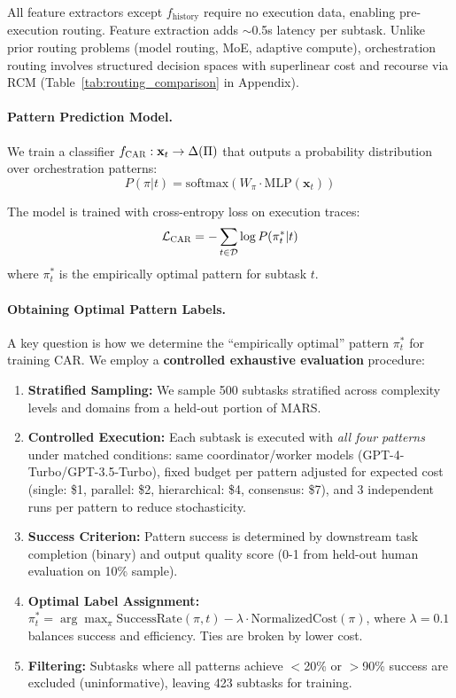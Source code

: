 \documentclass{article}
\theoremstyle{plain}
\theoremstyle{definition}
\theoremstyle{remark}
\begin{document}
All feature extractors except $f_{\text{history}}$ require no execution data, enabling pre-execution routing. Feature extraction adds $\sim$0.5s latency per subtask. Unlike prior routing problems (model routing, MoE, adaptive compute), orchestration routing involves structured decision spaces with superlinear cost and recourse via RCM (Table~\ref{tab:routing_comparison} in Appendix).

\paragraph{Pattern Prediction Model.}

We train a classifier $f_{\textsc{CAR}{}}: \mathbf{x}_t \rightarrow \Delta(\Pi)$ that outputs a probability distribution over orchestration patterns:
\begin{equation}
	P(\pi | t) = \text{softmax}(W_\pi \cdot \text{MLP}(\mathbf{x}_t))
\end{equation}

The model is trained with cross-entropy loss on execution traces:
\begin{equation}
	\mathcal{L}_{\textsc{CAR}{}} = -\sum_{t \in \mathcal{D}} \log P(\pi^*_t | t)
\end{equation}
where $\pi^*_t$ is the empirically optimal pattern for subtask $t$.

\paragraph{Obtaining Optimal Pattern Labels.}
A key question is how we determine the ``empirically optimal'' pattern $\pi^*_t$ for training CAR. We employ a \textbf{controlled exhaustive evaluation} procedure:

\begin{enumerate}[nosep,leftmargin=*]
	\item \textbf{Stratified Sampling:} We sample 500 subtasks stratified across complexity levels and domains from a held-out portion of MARS.
	\item \textbf{Controlled Execution:} Each subtask is executed with \emph{all four patterns} under matched conditions: same coordinator/worker models (GPT-4-Turbo/GPT-3.5-Turbo), fixed budget per pattern adjusted for expected cost (single: \$1, parallel: \$2, hierarchical: \$4, consensus: \$7), and 3 independent runs per pattern to reduce stochasticity.
	\item \textbf{Success Criterion:} Pattern success is determined by downstream task completion (binary) and output quality score (0-1 from held-out human evaluation on 10\% sample).
	\item \textbf{Optimal Label Assignment:} $\pi^*_t = \arg\max_\pi \text{SuccessRate}(\pi, t) - \lambda \cdot \text{NormalizedCost}(\pi)$, where $\lambda=0.1$ balances success and efficiency. Ties are broken by lower cost.
	\item \textbf{Filtering:} Subtasks where all patterns achieve $<$20\% or $>$90\% success are excluded (uninformative), leaving 423 subtasks for training.
\end{enumerate}
\end{document}
